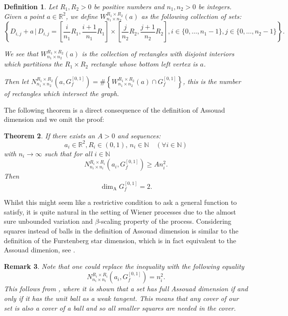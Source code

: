 \documentclass{amsart}
\newcommand{\Assouad}{\dim_{\mathrm{A}}}
\newtheorem{thm}{Theorem}[section]
\newtheorem{defn}[thm]{Definition}
\newtheorem{rem}[thm]{Remark}
\begin{document}
\begin{defn}\label{Win}
	Let $R_1,R_2>0$ be positive numbers and $n_1,n_2>0$ be integers. Given a point $a\in\mathbb{R}^2$, we define $W_{n_1\times n_2}^{R_1\times R_2}(a)$ as the following collection of sets:
	\[	
	\left\{D_{i,j}+a \, \vert \, D_{i,j}=\left[\frac{i}{n_1}R_1,\frac{i+1}{n_1}R_1\right]\times \left[\frac{j}{n_2}R_2,\frac{j+1}{n_2}R_2\right], i\in\{0,\dots,n_1-1\}, j\in\{0,\dots,n_2-1\}\right\}.
	\]
	
	We see that $W_{n_1\times n_2}^{R_1\times R_2}(a)$ is the collection of rectangles with disjoint interiors which partitions the $R_1\times R_2$ rectangle whose bottom left vertex is $a$.
	
	Then let $N_{n_1\times n_2}^{R_1 \times R_2 }(a,G_f^{[0,1]})= \# \left\{ W_{n_1\times n_2}^{R_1\times R_2}(a) \cap G_f^{[0,1]} \right\}$, this is the number of rectangles which intersect the graph.
\end{defn}

The following theorem is a direct consequence of the definition of Assouad dimension and we omit the proof:


\begin{thm}\label{graph}
	If there exists an $A>0$ and sequences:
	\[
	a_i\in \mathbb{R}^2,R_i\in (0,1),\, n_i\in\mathbb{N} \quad (\forall i\in \mathbb{N})
	\]
	with $n_i \rightarrow \infty$ such that for all $i\in\mathbb{N}$
	\[
	N_{n_i\times n_i}^{R_i \times R_i }(a_i,G_f^{[0,1]})\geq A n_i^2.
	\]
	Then
	\[
	\Assouad G_f^{[0,1]}=2.
	\]
\end{thm}

Whilst this might seem like a restrictive condition to ask a general function to satisfy, it is quite natural in the setting of Wiener processes due to the almost sure unbounded variation and $\beta$-scaling property of the process. Considering squares instead of balls in the definition of Assouad dimension is similar to the definition of the Furstenberg star dimension, which is in fact equivalent to the Assouad dimenion, see \cite{chenwuwu}.

\begin{rem}
	Note that one could replace the inequality with the following equality
	\[
	N_{n_i\times n_i}^{R_i \times R_i }(a_i,G_f^{[0,1]})= n_i^2.
	\]
	This follows from \cite[Theorem 2.4]{FY}, where it is shown that a set has full Assouad dimension if and only if it has the unit ball as a weak tangent. This means that any cover of our set is also a cover of a ball and so all smaller squares are needed in the cover.
\end{rem}
\end{document}
